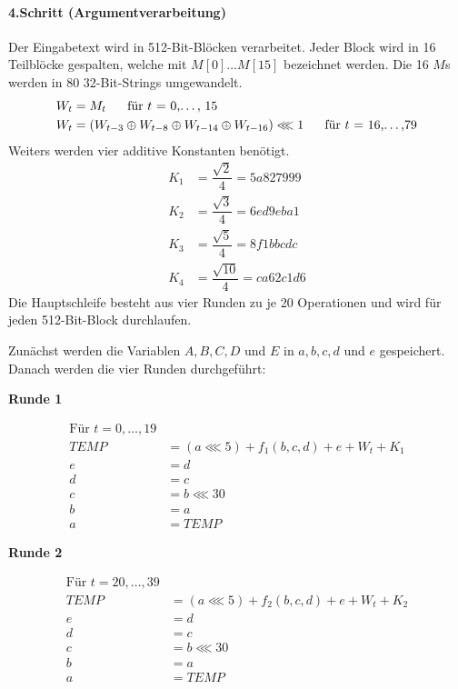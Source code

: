 \documentclass[12pt,a4paper]{scrartcl}
\numberwithin{equation}{section}
\numberwithin{myalgctr}{section}
\numberwithin{mytheoremctr}{section}
\newcommand{\mpar}[1]{\paragraph*{#1}\mbox{}\par}
\begin{document}
	\mpar{4.Schritt (Argumentverarbeitung)}\noindent
	Der Eingabetext wird in 512-Bit-Blöcken verarbeitet. Jeder Block wird in 16 Teilblöcke gespalten, welche mit $M[0]\dots M[15]$ bezeichnet werden. Die 16 $M$s werden in 80 32-Bit-Strings umgewandelt. 
	\begin{align*}
		W_t &= M_t	\text{~~~~~für $t$ = 0,\dots , 15}\\
		W_t &= (W_{t-3}\oplus W_{t-8}\oplus W_{t-14}\oplus W_{t-16})\lll 1 \text{~~~~~für $t$ = 16,\dots ,79}
	\end{align*}
	Weiters werden vier additive Konstanten benötigt.
	\begin{align*}
		K_1&=\dfrac{\sqrt{2}}{4} = 5a827999\\
		K_2&=\dfrac{\sqrt{3}}{4} = 6ed9eba1\\
		K_3&=\dfrac{\sqrt{5}}{4} = 8f1bbcdc\\
		K_4&=\dfrac{\sqrt{10}}{4} = ca62c1d6
	\end{align*}
	\noindent
	Die Hauptschleife besteht aus vier Runden zu je 20 Operationen und wird für jeden 512-Bit-Block durchlaufen.\par\noindent
	Zunächst werden die Variablen $A,B,C,D$ und $E$ in $a,b,c,d$ und $e$ gespeichert. Danach werden die vier Runden durchgeführt:\\
	\newline

	\noindent \textbf{Runde 1}\par
		\begin{align*}
			\text{Für $t = 0,\dots ,19$}\\
				TEMP &= (a\lll 5) + f_1(b,c,d) + e + W_t + K_1\\
				e&=d\\
				d&=c\\
				c&=b\lll 30\\
				b&=a\\
				a&=TEMP
		\end{align*}

	\noindent \textbf{Runde 2}\par
	\begin{align*}
	\text{Für $t = 20,\dots ,39$}\\
	TEMP &= (a\lll 5) + f_2(b,c,d) + e + W_t + K_2\\
	e&=d\\
	d&=c\\
	c&=b\lll 30\\
	b&=a\\
	a&=TEMP
	\end{align*}\newpage
\end{document}
